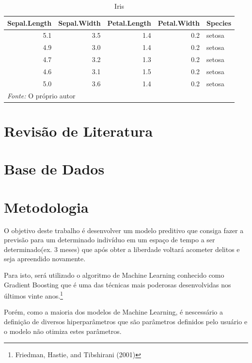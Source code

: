 \documentclass[
	12pt,				%
	a4paper,		%
	oneside,    %
	chapter=TITLE,		   %
	section=TITLE,		   %
	subsection=TITLE,	   %
	subsubsection=TITLE, %
	english,			%
	french,				%
	spanish,			%
	brazil,				%
]{abntex2}
\begin{document}
\begin{table}

\caption{\label{tab:unnamed-chunk-8}Iris}
\centering
\begin{tabular}[t]{r|r|r|r|l}
\hline
Sepal.Length & Sepal.Width & Petal.Length & Petal.Width & Species\\
\hline
5.1 & 3.5 & 1.4 & 0.2 & setosa\\
\hline
4.9 & 3.0 & 1.4 & 0.2 & setosa\\
\hline
4.7 & 3.2 & 1.3 & 0.2 & setosa\\
\hline
4.6 & 3.1 & 1.5 & 0.2 & setosa\\
\hline
5.0 & 3.6 & 1.4 & 0.2 & setosa\\
\hline
\multicolumn{5}{l}{\textit{Fonte: } O próprio autor}\\
\end{tabular}
\end{table}

\hypertarget{revisuxe3o-de-literatura}{%
\chapter{Revisão de Literatura}\label{revisuxe3o-de-literatura}}

\hypertarget{base-de-dados}{%
\chapter{Base de Dados}\label{base-de-dados}}

\hypertarget{metodologia}{%
\chapter{Metodologia}\label{metodologia}}

O objetivo deste trabalho é desenvolver um modelo preditivo que consiga
fazer a previsão para um determinado indivíduo em um espaço de tempo a
ser determinado(ex. 3 meses) que após obter a liberdade voltará acometer
delitos e seja apreendido novamente.

Para isto, será utilizado o algoritmo de Machine Learning conhecido como
Gradient Boosting que é uma das técnicas mais poderosas desenvolvidas
nos últimos vinte anos.\footnote{Friedman, Hastie, and Tibshirani (2001)}

Porém, como a maioria dos modelos de Machine Learning, é nescessário a
definição de diversos hiperparâmetros que são parâmetros definidos pelo
usuário e o modelo não otimiza estes parâmetros.
\end{document}
